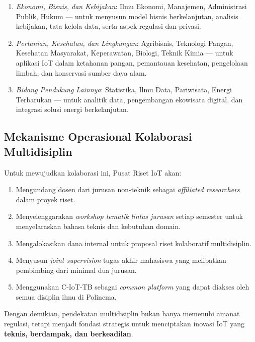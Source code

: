 \documentclass[12pt,a4paper]{article}
\begin{document}
\begin{enumerate}[leftmargin=*]
\begin{enumerate}
              \item \textit{Ekonomi, Bisnis, dan Kebijakan}:
                    Ilmu Ekonomi, Manajemen, Administrasi Publik, Hukum — untuk menyusun model bisnis berkelanjutan, analisis kebijakan, tata kelola data, serta aspek regulasi dan privasi.

              \item \textit{Pertanian, Kesehatan, dan Lingkungan}:
                    Agribisnis, Teknologi Pangan, Kesehatan Masyarakat, Keperawatan, Biologi, Teknik Kimia — untuk aplikasi IoT dalam ketahanan pangan, pemantauan kesehatan, pengelolaan limbah, dan konservasi sumber daya alam.

              \item \textit{Bidang Pendukung Lainnya}:
                    Statistika, Ilmu Data, Pariwisata, Energi Terbarukan — untuk analitik data, pengembangan ekowisata digital, dan integrasi solusi energi berkelanjutan.
          \end{enumerate}
\end{enumerate}


\subsection{Mekanisme Operasional Kolaborasi Multidisiplin}

Untuk mewujudkan kolaborasi ini, Pusat Riset IoT akan:
\begin{enumerate}[leftmargin=*]
    \item Mengundang dosen dari jurusan non-teknik sebagai \textit{affiliated researchers} dalam proyek riset.
    \item Menyelenggarakan \textit{workshop tematik lintas jurusan} setiap semester untuk menyelaraskan bahasa teknis dan kebutuhan domain.
    \item Mengalokasikan dana internal untuk proposal riset kolaboratif multidisiplin.
    \item Menyusun \textit{joint supervision} tugas akhir mahasiswa yang melibatkan pembimbing dari minimal dua jurusan.
    \item Menggunakan C-IoT-TB sebagai \textit{common platform} yang dapat diakses oleh semua disiplin ilmu di Polinema.
\end{enumerate}

Dengan demikian, pendekatan multidisiplin bukan hanya memenuhi amanat regulasi, tetapi menjadi fondasi strategis untuk menciptakan inovasi IoT yang \textbf{teknis, berdampak, dan berkeadilan}.
\end{document}
